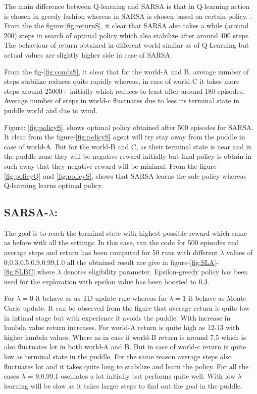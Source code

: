\documentclass[preprint,12pt]{elsarticle}
\begin{document}
The main difference between Q-learning and SARSA is that in Q-learning action is chosen in greedy fashion whereas in SARSA is chosen based on certain policy. \cite{medium}. From the the figure:\ref{fig:returnS}, it clear that SARSA also takes a while (around 200) steps in search of optimal policy which also stabilize after around 400 steps. The behaviour of return obtained in different world similar as of Q-Learning but actual values are slightly higher side in case of SARSA.


From the fig-\ref{fig:combiS}, it clear that for the world-A and B, average number of steps stabilize reduces quite rapidly  whereas, in case of world-C it takes more steps around 25000+ initially which reduces to least after around 180 episodes. Average number of steps in world-c fluctuates due to less its terminal state in puddle world and due to wind. 



Figure: \ref{fig:policyS}, shows optimal policy obtained after 500 episodes for SARSA. It clear from the figure-\ref{fig:policyS} agent will try stay away from the puddle in case of world-A. But for the world-B and C, as their terminal state is near and in the puddle zone they will be negative reward initially but final policy is obtain in such away that they negative reward will be minimal. From the figure-\ref{fig:policyQ} and \ref{fig:policyS}, shows that SARSA learns the safe policy whereas Q-learning learns optimal policy.

\subsection{SARSA-$\lambda$:}
The goal is to reach the terminal state with highest possible reward which same as before with all the settings. In this case, ran the code for 500 episodes and average steps and return has been computed for 50 runs with different $\lambda$ values of {0,0.3,0.5,0.9,0.99,1.0} all the obtained result are give in figure-\ref{fig:SLA}-\ref{fig:SLBC}.where $\lambda$  denotes eligibility parameter. Epsilon-greedy policy has been used for the exploration with epsilon value has been boosted to 0.3. 

For $\lambda=0$ it behave as as TD update rule whereas for $\lambda=1$ it behave as Monte-Carlo update. It can be observed from the figure that average return is quite low in intimal stage but with experience it avoids the puddle. With increase in lambda value return increases. For world-A return is quite high as 12-13 with higher lambda values. Where as in case if world-B return is around 7.5 which is also fluctuates lot in both world-A and B. But in case of world-c return is quite low as terminal state in the puddle. For the same reason average steps also fluctuates lot and it takes quite long to stabilize and learn the policy. For all the cases $\lambda$ = {9,0.99,1} oscillates a lot initially but performs quite well. With low $\lambda$ learning will be slow as it takes larger steps to find out the goal in the puddle.
\end{document}
